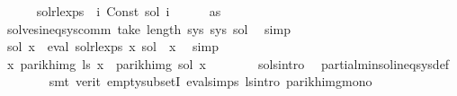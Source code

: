\begin{isabellebody}
\isanewline
\ \ \ \ \isamarkupfalse%
\ {\isacharquery}{\kern0pt}sol{\isacharunderscore}{\kern0pt}rlexps\ {\isacharequal}{\kern0pt}\ {\isachardoublequoteopen}{\isasymlambda}i{\isachardot}{\kern0pt}\ Const\ {\isacharparenleft}{\kern0pt}sol{\isacharprime}{\kern0pt}\ i{\isacharparenright}{\kern0pt}{\isachardoublequoteclose}\isanewline
\ \ \ \ \isamarkupfalse%
\ as\ \isamarkupfalse%
\ {\isachardoublequoteopen}solves{\isacharunderscore}{\kern0pt}ineq{\isacharunderscore}{\kern0pt}sys{\isacharunderscore}{\kern0pt}comm\ {\isacharparenleft}{\kern0pt}take\ {\isacharparenleft}{\kern0pt}length\ sys{\isacharparenright}{\kern0pt}\ sys{\isacharparenright}{\kern0pt}\ sol{\isacharprime}{\kern0pt}{\isachardoublequoteclose}\ \isamarkupfalse%
\ simp\isanewline
\ \ \ \ \isamarkupfalse%
\ \isamarkupfalse%
\ {\isachardoublequoteopen}sol{\isacharprime}{\kern0pt}\ x\ {\isacharequal}{\kern0pt}\ eval\ {\isacharparenleft}{\kern0pt}{\isacharquery}{\kern0pt}sol{\isacharunderscore}{\kern0pt}rlexps\ x{\isacharparenright}{\kern0pt}\ sol{\isacharprime}{\kern0pt}{\isachardoublequoteclose}\ \ x\ \isamarkupfalse%
\ simp\isanewline
\ \ \ \ \isamarkupfalse%
\ \isamarkupfalse%
\ {\isachardoublequoteopen}{\isasymforall}x{\isachardot}{\kern0pt}\ parikh{\isacharunderscore}{\kern0pt}img\ {\isacharparenleft}{\kern0pt}{\isacharquery}{\kern0pt}ls{\isacharprime}{\kern0pt}\ x{\isacharparenright}{\kern0pt}\ {\isasymsubseteq}\ parikh{\isacharunderscore}{\kern0pt}img\ {\isacharparenleft}{\kern0pt}sol{\isacharprime}{\kern0pt}\ x{\isacharparenright}{\kern0pt}{\isachardoublequoteclose}\isanewline
\ \ \ \ \ \ \isamarkupfalse%
\ sols{\isacharunderscore}{\kern0pt}intro\ \isamarkupfalse%
\ partial{\isacharunderscore}{\kern0pt}min{\isacharunderscore}{\kern0pt}sol{\isacharunderscore}{\kern0pt}ineq{\isacharunderscore}{\kern0pt}sys{\isacharunderscore}{\kern0pt}def\isanewline
\ \ \ \ \ \ \isamarkupfalse%
\ {\isacharparenleft}{\kern0pt}smt\ {\isacharparenleft}{\kern0pt}verit{\isacharparenright}{\kern0pt}\ empty{\isacharunderscore}{\kern0pt}subsetI\ eval{\isachardot}{\kern0pt}simps{\isacharparenleft}{\kern0pt}{}{\isacharparenright}{\kern0pt}\ ls{\isacharprime}{\kern0pt}{\isacharunderscore}{\kern0pt}intro\ parikh{\isacharunderscore}{\kern0pt}img{\isacharunderscore}{\kern0pt}mono{\isacharparenright}{\kern0pt}\isanewline
\ \ \isamarkupfalse%

\end{isabellebody}
